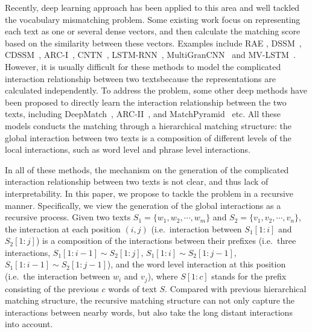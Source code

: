 Recently, deep learning approach has been applied to this area and well tackled the vocabulary mismatching problem. Some existing work focus on representing each text as one or several dense vectors, and then calculate the matching score based on the similarity between these vectors. Examples include RAE \cite{socher2011dynamic}, DSSM~\cite{Huang2013LearningDS}, CDSSM~\cite{Shen2014ALS}, ARC-I~\cite{hu2014convolutional}, CNTN~\cite{qiu2015convolutional},  LSTM-RNN~\cite{palangideep}, MultiGranCNN~\cite{yin2015convolutional} and MV-LSTM~\cite{wan2016deep}. However, it is usually difficult for these methods to model the complicated interaction relationship between two textsbecause the representations are calculated independently. To address the problem, some other deep methods have been proposed to directly learn the interaction relationship between the two texts, including DeepMatch~\cite{lu2013deep}, ARC-II~\cite{hu2014convolutional}, and MatchPyramid~\cite{Pang2016TextMA} etc. All these models conducts the matching through a hierarchical matching structure: the global interaction between two texts is a composition of different levels of the local interactions, such as word level and phrase level interactions.

In all of these methods, the mechanism on the generation of the complicated interaction relationship between two texts is not clear, and thus lack of interpretability. In this paper, we propose to tackle the problem in a recursive manner. Specifically, we view the generation of the global interactions as a recursive process. Given two texts $S_1\!\!=\!\!\{w_1,w_2,\cdots,w_m\}$ and $S_2\!\!=\!\!\{v_1,v_2,\cdots,v_n\}$, the interaction at each position $(i,j)$ (i.e.~interaction between $S_1[1{:}i]$ and $S_2[1{:}j]$) is a composition of the interactions between their prefixes (i.e.~three interactions, $S_1[1{:}i{-}1]\!{\sim}\! S_2[1{:}j]$, $S_1[1{:}i]\!{\sim}\! S_2[1{:}j{-}1]$, $S_1[1{:}i{-}1]{\sim} S_2[1{:}j{-}1]$), and the word level interaction at this position (i.e.~the interaction between $w_i$ and $v_j$), where $S[1{:}c]$ stands for the prefix consisting of the previous $c$ words of text $S$. Compared with previous hierarchical matching structure, the recursive matching structure can not only capture the interactions between nearby words, but also take the long distant interactions into account.

